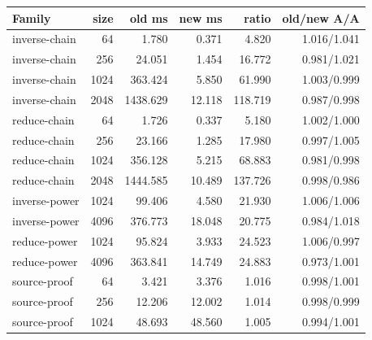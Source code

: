 \begin{center}\small
\begin{tabular}{@{}lrrrrr@{}}
\toprule
Family & size & old ms & new ms & ratio & old/new A/A \\
\midrule
inverse-chain & 64 & 1.780 & 0.371 & 4.820 & 1.016/1.041 \\
inverse-chain & 256 & 24.051 & 1.454 & 16.772 & 0.981/1.021 \\
inverse-chain & 1024 & 363.424 & 5.850 & 61.990 & 1.003/0.999 \\
inverse-chain & 2048 & 1438.629 & 12.118 & 118.719 & 0.987/0.998 \\
reduce-chain & 64 & 1.726 & 0.337 & 5.180 & 1.002/1.000 \\
reduce-chain & 256 & 23.166 & 1.285 & 17.980 & 0.997/1.005 \\
reduce-chain & 1024 & 356.128 & 5.215 & 68.883 & 0.981/0.998 \\
reduce-chain & 2048 & 1444.585 & 10.489 & 137.726 & 0.998/0.986 \\
inverse-power & 1024 & 99.406 & 4.580 & 21.930 & 1.006/1.006 \\
inverse-power & 4096 & 376.773 & 18.048 & 20.775 & 0.984/1.018 \\
reduce-power & 1024 & 95.824 & 3.933 & 24.523 & 1.006/0.997 \\
reduce-power & 4096 & 363.841 & 14.749 & 24.883 & 0.973/1.001 \\
source-proof & 64 & 3.421 & 3.376 & 1.016 & 0.998/1.001 \\
source-proof & 256 & 12.206 & 12.002 & 1.014 & 0.998/0.999 \\
source-proof & 1024 & 48.693 & 48.560 & 1.005 & 0.994/1.001 \\
\bottomrule
\end{tabular}
\end{center}
